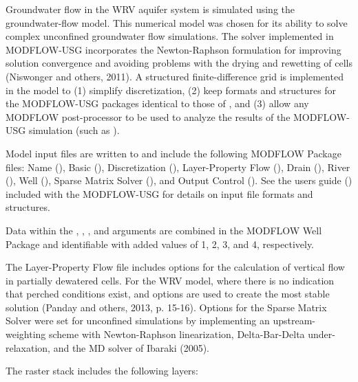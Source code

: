 \documentclass[a4paper]{book}
\begin{document}
\begin{Details}\relax
Groundwater flow in the WRV aquifer system is simulated using the  groundwater-flow model.
This numerical model was chosen for its ability to solve complex unconfined groundwater flow simulations.
The solver implemented in MODFLOW-USG incorporates the Newton-Raphson formulation for improving solution convergence and avoiding problems with the drying and rewetting of cells (Niswonger and others, 2011).
A structured finite-difference grid is implemented in the model to
(1) simplify discretization,
(2) keep formats and structures for the MODFLOW-USG packages identical to those of , and
(3) allow any MODFLOW post-processor to be used to analyze the results of the MODFLOW-USG simulation (such as ).

Model input files are written to  and include the following MODFLOW Package files: Name (), Basic (), Discretization (), Layer-Property Flow (), Drain (), River (),  Well (), Sparse Matrix Solver (), and Output Control ().
See the users guide (\Cite{Description of Model Input and Output}) included with the MODFLOW-USG  for details on input file formats and structures.

Data within the , , , and  arguments are combined in the MODFLOW Well Package and identifiable with added  values of 1, 2, 3, and 4, respectively.

The Layer-Property Flow file includes options for the calculation of vertical flow in partially dewatered cells.
For the WRV model, where there is no indication that perched conditions exist,  and  options are used to create the most stable solution (Panday and others, 2013, p. 15-16).
Options for the Sparse Matrix Solver were set for unconfined simulations by implementing an upstream-weighting scheme with Newton-Raphson linearization, Delta-Bar-Delta under-relaxation, and the \eqn{\chi}{}MD solver of Ibaraki (2005).

The raster stack  includes the following layers:
\begin{description}


\end{description}
\end{Details}
\end{document}

